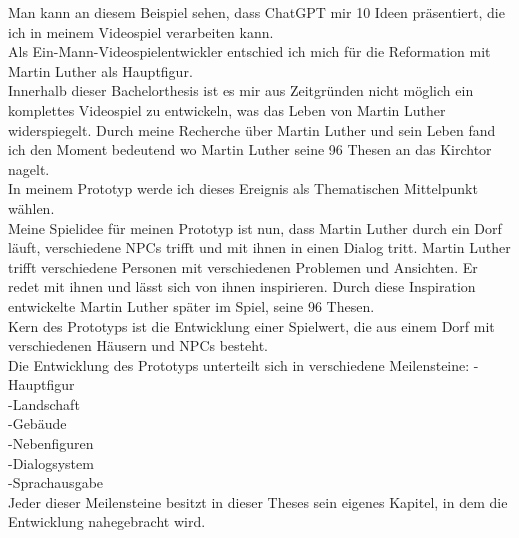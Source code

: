 Man kann an diesem Beispiel sehen, dass ChatGPT mir 10 Ideen präsentiert, die ich in meinem Videospiel verarbeiten kann.
\\
Als Ein-Mann-Videospielentwickler entschied ich mich für die Reformation mit Martin Luther als Hauptfigur.
\\
Innerhalb dieser Bachelorthesis ist es mir aus Zeitgründen nicht möglich ein komplettes Videospiel zu entwickeln, was das Leben von Martin Luther widerspiegelt. Durch meine Recherche über Martin Luther und sein Leben fand ich den Moment bedeutend wo Martin Luther seine 96 Thesen an das Kirchtor nagelt.
\\
In meinem Prototyp werde ich dieses Ereignis als Thematischen Mittelpunkt wählen.
\\
Meine Spielidee für meinen Prototyp ist nun, dass Martin Luther durch ein Dorf läuft, verschiedene NPCs trifft und mit ihnen in einen Dialog tritt. Martin Luther trifft verschiedene Personen mit verschiedenen Problemen und Ansichten. Er redet mit ihnen und lässt sich von ihnen inspirieren. Durch diese Inspiration entwickelte Martin Luther später im Spiel, seine 96 Thesen.
\\
Kern des Prototyps ist die Entwicklung einer Spielwert, die aus einem Dorf mit verschiedenen Häusern und NPCs besteht.
\\
Die Entwicklung des Prototyps unterteilt sich in verschiedene Meilensteine:
-Hauptfigur
\\
-Landschaft
\\
-Gebäude
\\
-Nebenfiguren
\\
-Dialogsystem
\\
-Sprachausgabe
\\
Jeder dieser Meilensteine besitzt in dieser Theses sein eigenes Kapitel, in dem die Entwicklung nahegebracht wird.

